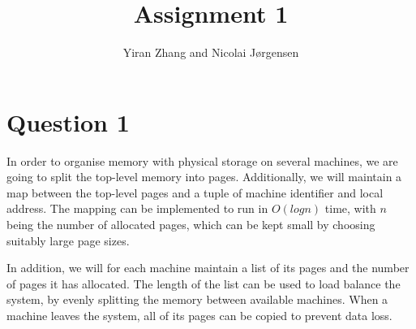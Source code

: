 \documentclass[11pt]{article}
\title          {Assignment 1}
\author         {Yiran Zhang and Nicolai Jørgensen}
\begin{document}
\maketitle
\newpage

\section{Question 1}

In order to organise memory with physical storage on several machines, we are
going to split the top-level memory into pages. Additionally, we will maintain a
map between the top-level pages and a tuple of machine identifier and local
address. The mapping can be implemented to run in $O(log n)$ time, with $n$ being the
number of allocated pages, which can be kept small by choosing suitably large
page sizes.

In addition, we will for each machine maintain a list of its pages and the
number of pages it has allocated. The length of the list can be used to load
balance the system, by evenly splitting the memory between available machines.
When a machine leaves the system, all of its pages can be copied to prevent data
loss.
\end{document}
